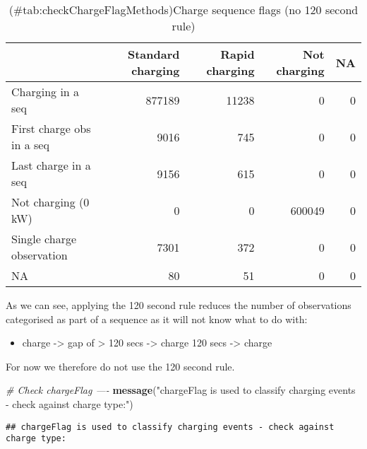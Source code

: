 \documentclass[]{article}
\newenvironment{Shaded}{\begin{snugshade}}{\end{snugshade}}
\newcommand{\CommentTok}[1]{\textcolor[rgb]{0.56,0.35,0.01}{\textit{#1}}}
\newcommand{\DataTypeTok}[1]{\textcolor[rgb]{0.13,0.29,0.53}{#1}}
\newcommand{\KeywordTok}[1]{\textcolor[rgb]{0.13,0.29,0.53}{\textbf{#1}}}
\newcommand{\NormalTok}[1]{#1}
\newcommand{\OperatorTok}[1]{\textcolor[rgb]{0.81,0.36,0.00}{\textbf{#1}}}
\newcommand{\StringTok}[1]{\textcolor[rgb]{0.31,0.60,0.02}{#1}}
\providecommand{\tightlist}{%
  \setlength{\itemsep}{0pt}\setlength{\parskip}{0pt}}
\begin{document}
\begin{table}[t]

\caption{(\#tab:checkChargeFlagMethods)Charge sequence flags (no 120 second rule)}
\centering
\begin{tabular}{l|r|r|r|r}
\hline
  & Standard charging & Rapid charging & Not charging & NA\\
\hline
Charging in a seq & 877189 & 11238 & 0 & 0\\
\hline
First charge obs in a seq & 9016 & 745 & 0 & 0\\
\hline
Last charge in a seq & 9156 & 615 & 0 & 0\\
\hline
Not charging (0 kW) & 0 & 0 & 600049 & 0\\
\hline
Single charge observation & 7301 & 372 & 0 & 0\\
\hline
NA & 80 & 51 & 0 & 0\\
\hline
\end{tabular}
\end{table}

As we can see, applying the 120 second rule reduces the number of observations categorised as part of a sequence as it will not know what to do with:

\begin{itemize}
\tightlist
\item
  charge -\textgreater{} gap of \textgreater{} 120 secs -\textgreater{} charge 120 secs -\textgreater{} charge
\end{itemize}

For now we therefore do not use the 120 second rule.

\begin{Shaded}
\begin{Highlighting}[]
\CommentTok{# Check chargeFlag ----}
\KeywordTok{message}\NormalTok{(}\StringTok{"chargeFlag is used to classify charging events - check against charge type:"}\NormalTok{)}
\end{Highlighting}
\end{Shaded}

\begin{verbatim}
## chargeFlag is used to classify charging events - check against charge type:
\end{verbatim}

\begin{Shaded}
\end{Shaded}
\end{document}
